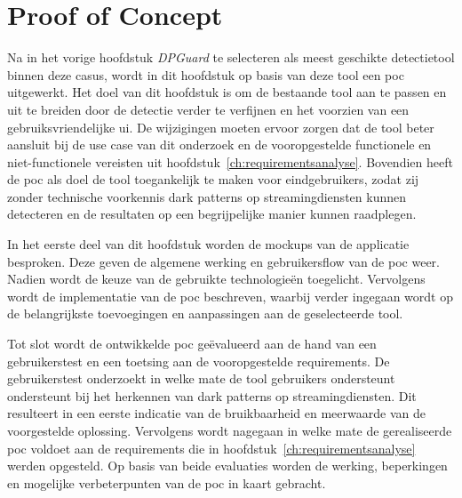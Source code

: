 
\chapter{Proof of Concept}%
\label{ch:poc}

Na in het vorige hoofdstuk \textit{DPGuard} te selecteren als meest geschikte detectietool binnen deze casus, wordt in dit hoofdstuk op basis van deze tool een \acrshort{poc} uitgewerkt. Het doel van dit hoofdstuk is om de bestaande tool aan te passen en uit te breiden door de detectie verder te verfijnen en het voorzien van een gebruiksvriendelijke \acrlong{ui}. De wijzigingen moeten ervoor zorgen dat de tool beter aansluit bij de use case van dit onderzoek en de vooropgestelde functionele en niet-functionele vereisten uit hoofdstuk~\ref{ch:requirementsanalyse}. Bovendien heeft de \acrshort{poc} als doel de tool toegankelijk te maken voor eindgebruikers, zodat zij zonder technische voorkennis dark patterns op streamingdiensten kunnen detecteren en de resultaten op een begrijpelijke manier kunnen raadplegen.

\vspace{1em}

In het eerste deel van dit hoofdstuk worden de mockups van de applicatie besproken. Deze geven de algemene werking en gebruikersflow van de \acrshort{poc} weer. Nadien wordt de keuze van de gebruikte technologieën toegelicht. Vervolgens wordt de implementatie van de \acrshort{poc} beschreven, waarbij verder ingegaan wordt op de belangrijkste toevoegingen en aanpassingen aan de geselecteerde tool.

\vspace{1em}

Tot slot wordt de ontwikkelde \acrshort{poc} geëvalueerd aan de hand van een gebruikerstest en een toetsing aan de vooropgestelde requirements. De gebruikerstest onderzoekt in welke mate de tool gebruikers ondersteunt ondersteunt bij het herkennen van dark patterns op streamingdiensten. Dit resulteert in een eerste indicatie van de bruikbaarheid en meerwaarde van de voorgestelde oplossing. Vervolgens wordt nagegaan in welke mate de gerealiseerde \acrshort{poc} voldoet aan de requirements die in hoofdstuk~\ref{ch:requirementsanalyse} werden opgesteld. Op basis van beide evaluaties worden de werking, beperkingen en mogelijke verbeterpunten van de \acrshort{poc} in kaart gebracht.

